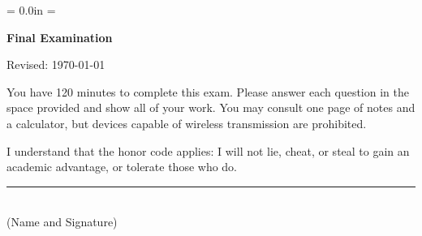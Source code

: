 \documentclass[letterpaper,12pt]{exam}
\def\HeadName{Final Examination}
\begin{document}
\parindent = 0.0in
\parskip = \bigskipamount
\thispagestyle{empty}%
\Head

\centerline{\large \bf \HeadName}%
\centerline{Revised:  \today}

\bigskip
You have 120 minutes to complete this exam.  Please answer each
question in the space provided and show all of your work.
You may consult one page of notes and a calculator,
but devices capable of wireless transmission are prohibited.

I understand that the honor code applies: I will not lie, cheat,
or steal to gain an academic advantage, or tolerate those who do.

\begin{flushright}
\rule{4in}{0.5pt} \\ (Name and Signature)
\end{flushright}
\end{document}
